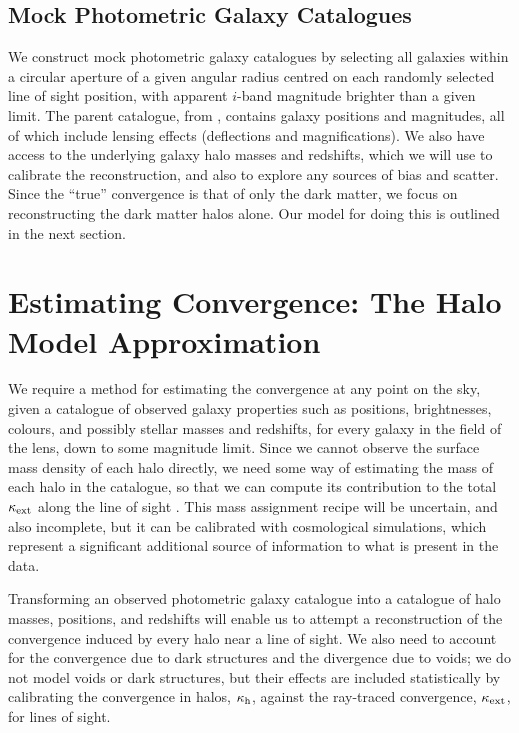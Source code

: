 \documentclass[useAMS,usenatbib,a4paper]{mn2e}
\begin{document}

\subsection{Mock Photometric Galaxy Catalogues}
\label{sec:MS:mocks}

We construct mock photometric galaxy catalogues by selecting all \MS galaxies
within a circular aperture of a given angular radius centred on each randomly
selected line of sight position, with apparent $i$-band magnitude brighter
than a given limit. The parent catalogue, from \citet{HilbertEtal2011},
contains galaxy positions and magnitudes, all of which include lensing effects
(deflections and magnifications). We also have access to the underlying galaxy
halo masses and redshifts, which we will use to calibrate the reconstruction,
and also to explore any sources of bias and scatter. Since the ``true''
convergence is that of only the dark matter, we focus on reconstructing the
dark matter halos alone. Our model for doing this is outlined in the next
section. 


\section{Estimating Convergence: The Halo Model Approximation}
\label{sec:model}

We require a method for estimating the convergence at any point on the sky,
given a catalogue of observed galaxy properties such as positions,
brightnesses, colours, and possibly stellar masses and redshifts, for every
galaxy in the field of the lens, down to some magnitude limit. Since we cannot
observe the surface mass density of each halo directly, we need some way of
estimating the mass of each halo in the catalogue, so that we can compute its
contribution to the total $\kappa_{\rm ext}$ along the line of sight \citep[as in
\eg][]{GunnarssonEtal2006,KarpenkaEtal2012}.  This mass
assignment recipe will be uncertain, and also incomplete, but it can be
calibrated with cosmological simulations, which represent a significant
additional source of information to what is present in the data.

Transforming an observed photometric galaxy catalogue into a  catalogue of
halo masses, positions, and redshifts will enable us to attempt a
reconstruction of the convergence induced by every halo near a line of sight. 
We also need to account for the convergence due to dark structures and the
divergence due to voids; we do not model voids or dark structures, but their
effects are included statistically by calibrating the convergence in
halos, $\kappa_{\rm h}$, against the ray-traced convergence, $\kappa_{\rm ext}$, for \MS lines
of sight.
\end{document}

